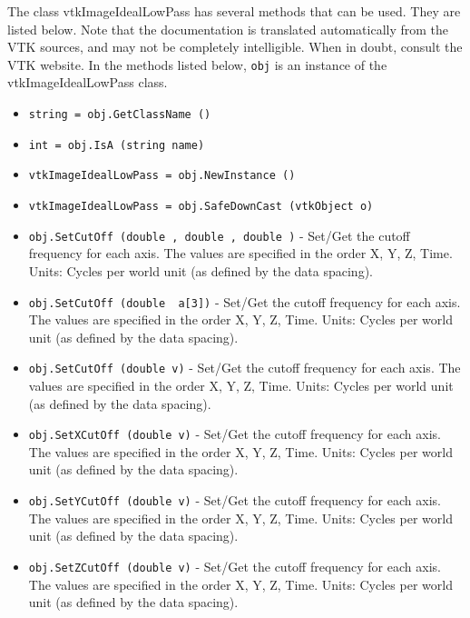 The class vtkImageIdealLowPass has several methods that can be used.
  They are listed below.
Note that the documentation is translated automatically from the VTK sources,
and may not be completely intelligible.  When in doubt, consult the VTK website.
In the methods listed below, \verb|obj| is an instance of the vtkImageIdealLowPass class.
\begin{itemize}
\item  \verb|string = obj.GetClassName ()|

\item  \verb|int = obj.IsA (string name)|

\item  \verb|vtkImageIdealLowPass = obj.NewInstance ()|

\item  \verb|vtkImageIdealLowPass = obj.SafeDownCast (vtkObject o)|

\item  \verb|obj.SetCutOff (double , double , double )| -  Set/Get the cutoff frequency for each axis.
 The values are specified in the order X, Y, Z, Time.
 Units: Cycles per world unit (as defined by the data spacing).

\item  \verb|obj.SetCutOff (double  a[3])| -  Set/Get the cutoff frequency for each axis.
 The values are specified in the order X, Y, Z, Time.
 Units: Cycles per world unit (as defined by the data spacing).

\item  \verb|obj.SetCutOff (double v)| -  Set/Get the cutoff frequency for each axis.
 The values are specified in the order X, Y, Z, Time.
 Units: Cycles per world unit (as defined by the data spacing).

\item  \verb|obj.SetXCutOff (double v)| -  Set/Get the cutoff frequency for each axis.
 The values are specified in the order X, Y, Z, Time.
 Units: Cycles per world unit (as defined by the data spacing).

\item  \verb|obj.SetYCutOff (double v)| -  Set/Get the cutoff frequency for each axis.
 The values are specified in the order X, Y, Z, Time.
 Units: Cycles per world unit (as defined by the data spacing).

\item  \verb|obj.SetZCutOff (double v)| -  Set/Get the cutoff frequency for each axis.
 The values are specified in the order X, Y, Z, Time.
 Units: Cycles per world unit (as defined by the data spacing).


\end{itemize}
